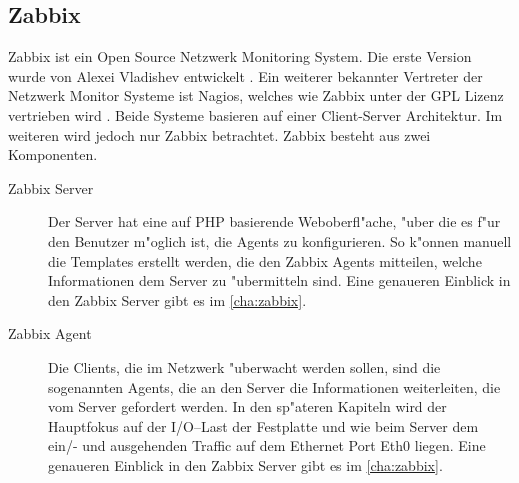 \subsection{Zabbix}
Zabbix ist ein Open Source Netzwerk Monitoring System. Die erste Version wurde von \mbox{Alexei} Vladishev entwickelt \autocite{zabbix:Web}. %
Ein weiterer bekannter Vertreter der Netzwerk Monitor Systeme ist Nagios, welches wie Zabbix unter der GPL Lizenz vertrieben wird \autocite{wiki:Nagios}. %
Beide Systeme basieren auf einer Client-Server Architektur. Im weiteren wird jedoch nur Zabbix betrachtet. %
Zabbix besteht aus zwei Komponenten. %

\begin{description}
\item[Zabbix Server]Der Server hat eine auf PHP basierende Weboberfl"ache, "uber die es f"ur den Benutzer m"oglich ist, die Agents zu %
konfigurieren. So k"onnen manuell die Templates erstellt werden, die den Zabbix Agents mitteilen, welche Informationen dem %
Server zu "ubermitteln sind. Eine genaueren Einblick in den Zabbix Server gibt es im \cref{cha:zabbix}. %
\item[Zabbix Agent]Die Clients, die im Netzwerk "uberwacht werden sollen, sind die sogenannten Agents, die an den Server %
die Informationen weiterleiten, die vom Server gefordert werden. In den sp"ateren Kapiteln wird der Hauptfokus auf der %
I/O--Last der Festplatte und wie beim Server dem ein/- und ausgehenden Traffic auf dem Ethernet Port Eth0 liegen. %
Eine genaueren Einblick in den Zabbix Server gibt es im \cref{cha:zabbix}. %
\end{description} 


